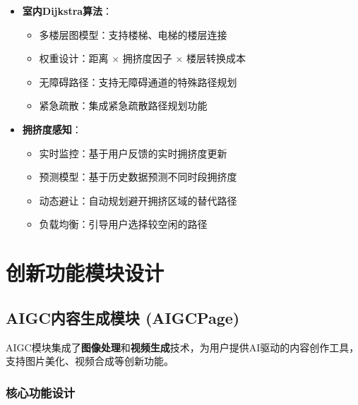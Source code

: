 \documentclass[12pt,a4paper]{article}
\begin{document}
\begin{itemize}
    \item \textbf{室内Dijkstra算法}：
    \begin{itemize}
        \item 多楼层图模型：支持楼梯、电梯的楼层连接
        \item 权重设计：距离 × 拥挤度因子 × 楼层转换成本
        \item 无障碍路径：支持无障碍通道的特殊路径规划
        \item 紧急疏散：集成紧急疏散路径规划功能
    \end{itemize}
    
    \item \textbf{拥挤度感知}：
    \begin{itemize}
        \item 实时监控：基于用户反馈的实时拥挤度更新
        \item 预测模型：基于历史数据预测不同时段拥挤度
        \item 动态避让：自动规划避开拥挤区域的替代路径
        \item 负载均衡：引导用户选择较空闲的路径
    \end{itemize}
\end{itemize}

\section{创新功能模块设计}

\subsection{AIGC内容生成模块 (AIGCPage)}

\begin{designbox}[title={AI驱动的内容创作}]
AIGC模块集成了\textbf{图像处理}和\textbf{视频生成}技术，为用户提供AI驱动的内容创作工具，支持图片美化、视频合成等创新功能。
\end{designbox}

\subsubsection{核心功能设计}
\end{document}
